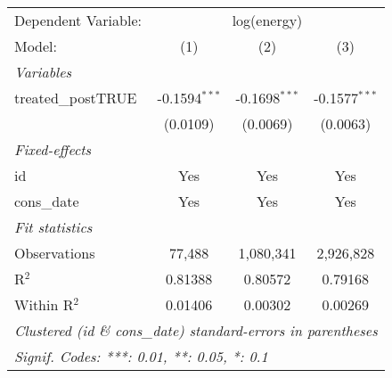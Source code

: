 
\begin{tabular}{lccc}
   \tabularnewline\midrule\midrule
   Dependent Variable: & \multicolumn{3}{c}{log(energy)}\\
   Model:             & (1)             & (2)             & (3)\\
   \midrule \emph{Variables} &   &   &  \\
   treated\_postTRUE & -0.1594$^{***}$ & -0.1698$^{***}$ & -0.1577$^{***}$\\
                      & (0.0109)        & (0.0069)        & (0.0063)\\
   \midrule \emph{Fixed-effects} &   &   &  \\
   id                 & Yes             & Yes             & Yes\\
   cons\_date        & Yes             & Yes             & Yes\\
   \midrule \emph{Fit statistics} &   &   &  \\
   Observations       & 77,488          & 1,080,341       & 2,926,828\\
   R$^2$              & 0.81388         & 0.80572         & 0.79168\\
   Within R$^2$       & 0.01406         & 0.00302         & 0.00269\\
   \midrule\midrule\multicolumn{4}{l}{\emph{Clustered (id \& cons\_date) standard-errors in parentheses}}\\
   \multicolumn{4}{l}{\emph{Signif. Codes: ***: 0.01, **: 0.05, *: 0.1}}\\
\end{tabular}


